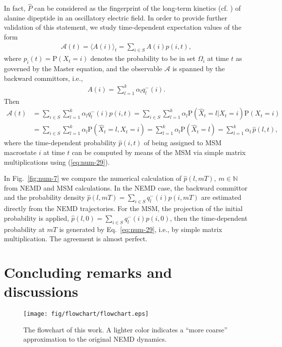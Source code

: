 \documentclass[aps, pre, preprint,unsortedaddress,a4paper,onecolumn]{revtex4}
\newcommand{\bwd}[0]{-}
\newcommand{\prob}{\textrm{P}}
\begin{document}
In fact, $\hat{P}$ can be considered as the fingerprint of the long-term kinetics (cf. \cite{A19-39,PrinzKellerNoe_PCCP11_Perspective}) of alanine dipeptide in an oscillatory electric field.
In order to provide further validation of this statement, we study  time-dependent expectation values of
the form
\begin{align}
  \mathcal A(t) = \langle A(i)\rangle_t = \sum_{i\in S} A(i) p(i,t),
\end{align}
where $p_i(t)=\prob(X_t=i)$ denotes the probability to be in set $\Omega_i$ at time $t$ as governed by the Master equation, and the observable $\mathcal A$ is spanned by the backward
committors, i.e.,
\begin{align}\label{A}
  A(i) = \sum_{l=1}^k \alpha_l q^\bwd_l(i).
\end{align}
Then
\begin{align}\nonumber
  \mathcal A(t) &=
  \sum_{i\in S} \sum_{l=1}^k \alpha_l q^\bwd_l(i)  p(i,t)=\sum_{i\in S} \sum_{l=1}^k \alpha_l \prob (\hat X_t = l \vert X_t = i) \prob (X_t = i) \\
  & =
  \sum_{i\in S} \sum_{l=1}^k \alpha_l \prob (\hat X_t = l ,X_t = i)  =
  \sum_{l=1}^k \alpha_l \prob (\hat X_t = l) 
 =
   \sum_{l=1}^k \alpha_l \,\hat p (l, t), \label{eq:num-28}
\end{align}
where the time-dependent probability $\hat{p}(i,t)$ of being assigned to MSM macrostate $i$ at time $t$ can be computed  by means of the MSM via simple matrix multiplications using (\ref{eq:num-29}).

In Fig.~\ref{fig:num-7} we compare the numerical calculation of $\hat p (l, mT), \ m\in\mathbb N$ from NEMD and MSM calculations.
In the NEMD case, the backward committor and the probability density $\hat p (l, mT) = \sum_{i\in S}  q^\bwd_l(i)  p(i,mT) $
are estimated directly from the
NEMD trajectories. For the MSM, the projection of the initial probability is applied, $\hat p (l, 0) = \sum_{i\in S}  q^\bwd_l(i)  p(i,0) $, then
the time-dependent probability at $mT$ is generated by Eq.~\eqref{eq:num-29}, i.e., by simple matrix multiplication. The agreement is almost perfect.


\section{Concluding remarks and discussions}

\begin{figure}
  \centering
  \texttt{[image: fig/flowchart/flowchart.eps]}
  \caption{The flowchart of this work. A lighter color indicates
  a ``more coarse'' approximation to the original NEMD dynamics.}
  \label{fig:flowchart}
\end{figure}
\end{document}
